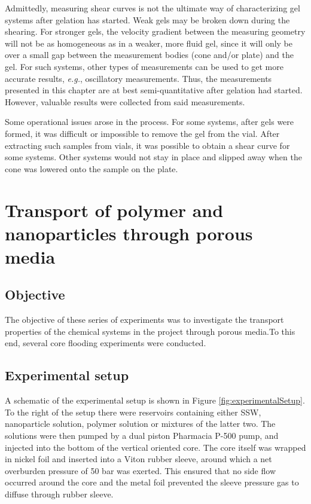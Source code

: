 Admittedly, measuring shear curves is not the ultimate way of characterizing gel systems after gelation has started. Weak gels may be broken down during the shearing. For stronger gels, the velocity gradient between the measuring geometry will not be as homogeneous as in a weaker, more fluid gel, since it will only be over a small gap between the measurement bodies (cone and/or plate) and the gel. For such systems, other types of measurements can be used to get more accurate results, \textit{e.g.}, oscillatory measurements. Thus, the measurements presented in this chapter are at best semi-quantitative after gelation had started. However, valuable results were collected from said measurements.

Some operational issues arose in the process. For some systems, after gels were formed, it was difficult or impossible to remove the gel from the vial. After extracting such samples from vials, it was possible to obtain a shear curve for some systems. Other systems would not stay in place and slipped away when the cone was lowered onto the sample on the plate.

\section{Transport of polymer and nanoparticles through porous media}
\subsection{Objective}
The  objective of these series of experiments was to investigate the transport properties of the chemical systems in the project through porous media.To this end, several core flooding experiments were conducted.

\subsection{Experimental setup}
A schematic of the experimental setup  is shown in Figure \ref{fig:experimentalSetup}. To the right of the setup there were reservoirs containing either SSW, nanoparticle solution, polymer solution or mixtures of the latter two. The solutions were then pumped by a dual piston Pharmacia P-500 pump, and injected into the bottom of the vertical oriented core. The core itself was wrapped in nickel foil and inserted into a Viton rubber sleeve, around which a net overburden pressure of 50 bar was exerted. This ensured that no side flow occurred around the core and the metal foil prevented the sleeve pressure gas to diffuse through rubber sleeve.

